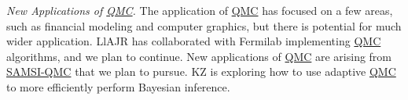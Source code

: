 \documentclass[11pt]{NSFamsart}
\newcommand{\QMC}{\hyperlink{QMClink}{QMC}\xspace}
\newcommand{\SAMSIQMC}{\hyperlink{SAMSIlink}{SAMSI-QMC}\xspace}
\begin{document}
\emph{New Applications of \QMC.}
The application of \QMC has focused on a few areas, such as financial modeling and computer 
graphics, but there is potential for much wider application.  LlAJR has collaborated with Fermilab implementing \QMC algorithms, and we plan to continue.    New applications of \QMC are arising from \SAMSIQMC that we plan to pursue.  KZ is exploring how to use adaptive \QMC to more efficiently perform Bayesian inference.


\newpage
\clearpage
\setcounter{page}{1}




{\renewcommand\addcontentsline[3]{} 
\renewcommand{\refname}{{\Large\textbf{References Cited}}}                   %
\renewcommand{\bibliofont}{\normalsize}

}
\end{document}
